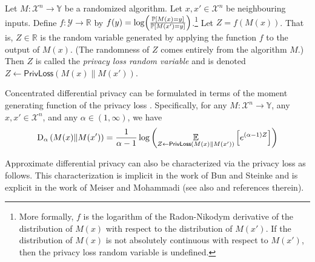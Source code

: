 \documentclass{jpcfinal} %
\newcommand{\ex}[2]{{\ifx&#1& \mathbb{E} \else
\underset{#1}{\mathbb{E}} \fi \left[#2\right]}}
\newcommand{\pr}[2]{{\ifx&#1& \mathbb{P} \else
\underset{#1}{\mathbb{P}} \fi \left[#2\right]}}
\newcommand{\dr}[3]{\mathrm{D}_{#1}\left(#2\middle\|#3\right)}
\newcommand{\privloss}[2]{\mathsf{PrivLoss}\left(#1\middle\|#2\right)}
\newcommand{\R}{\mathbb{R}}
\begin{document}
\begin{defi}\label{defn:privloss}
Let $M\colon \mathcal{X}^n \to \mathbb{Y}$ be a randomized algorithm. Let $x,x'\in\mathcal{X}^n$ be neighbouring inputs. Define $f\colon \mathcal{Y} \to \R$ by $f(y) = \log\!\left(\frac{\pr{}{M(x)=y}}{\pr{}{M(x')=y}}\right)$.\footnote{More formally, $f$ is the logarithm of the Radon-Nikodym derivative of the distribution of $M(x)$ with respect to the distribution of $M(x')$. If the distribution of $M(x)$ is not absolutely continuous with respect to $M(x')$, then the privacy loss random variable is undefined.} Let $Z=f(M(x))$. That is, $Z \in \R$ is the random variable generated by applying the function $f$ to the output of $M(x)$. (The randomness of $Z$ comes entirely from the algorithm $M$.)
Then $Z$ is called the \emph{privacy loss random variable} and is denoted $Z\gets\privloss{M(x)}{M(x')}$.
\end{defi}

Concentrated differential privacy can be formulated in terms of the moment generating function of the privacy loss \citep{BunS16}. Specifically, for any $M\colon \mathcal{X}^n \to \mathbb{Y}$, any $x,x' \in \mathcal{X}^n$, and any $\alpha \in (1,\infty)$, we have \begin{equation}
    \dr{\alpha}{M(x)}{M(x')} = \frac{1}{\alpha-1} \log \left( \ex{Z \gets \privloss{M(x)}{M(x')}}{e^{(\alpha-1)Z}} \right)
\end{equation}

Approximate differential privacy can also be characterized via the privacy loss as follows. This characterization is implicit in the work of Bun and Steinke \cite[Lemma B.2]{BunS16} and is explicit in the work of Meiser and Mohammadi \cite[Lemma 1]{MeiserM18} (see also \cite[Observation 2]{GoogleComposition} and references therein).
\end{document}
